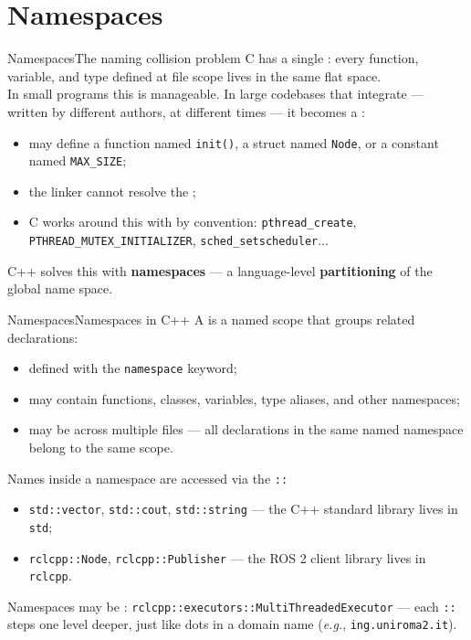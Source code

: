
\section{Namespaces}
\graphicspath{{figs/section6/}}

\begin{frame}{Namespaces}{The naming collision problem}
	\justifying
	C has a single : every function, variable, and type defined at file scope lives in the same flat space.\\
	\bigskip
	In small programs this is manageable. In large codebases that integrate  — written by different authors, at different times — it becomes a :
	\begin{itemize}
		\item {} may define a function named \texttt{init()}, a struct named \texttt{Node}, or a constant named \texttt{MAX\_SIZE};
		\item the linker cannot resolve the ;
		\item C works around this with  by convention: \texttt{pthread\_create}, \texttt{PTHREAD\_MUTEX\_INITIALIZER}, \texttt{sched\_setscheduler}...
	\end{itemize}
	\bigskip
	\begin{block}{}
		\centering
		C++ solves this with \textbf{namespaces} — a language-level \textbf{partitioning} of the global name space.
	\end{block}
\end{frame}
\begin{frame}{Namespaces}{Namespaces in C++}
	\justifying
	A  is a named scope that groups related declarations:
	\begin{itemize}
		\item defined with the \texttt{namespace} keyword;
		\item may contain functions, classes, variables, type aliases, and other namespaces;
		\item may be  across multiple files — all declarations in the same named namespace belong to the same scope.
	\end{itemize}
	\bigskip
	Names inside a namespace are accessed via the  \texttt{::}
	\begin{itemize}
		\item \texttt{std::vector}, \texttt{std::cout}, \texttt{std::string} — the C++ standard library lives in \texttt{std};
		\item \texttt{rclcpp::Node}, \texttt{rclcpp::Publisher} — the ROS 2 client library lives in \texttt{rclcpp}.
	\end{itemize}
	\bigskip
	Namespaces may be : \texttt{rclcpp::executors::MultiThreadedExecutor} — each \texttt{::} steps one level deeper, just like dots in a domain name (\emph{e.g.}, \texttt{ing.uniroma2.it}).
\end{frame}
